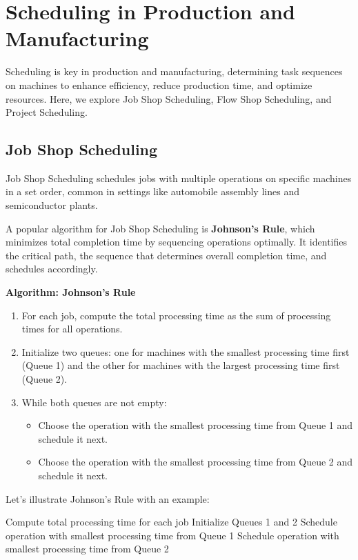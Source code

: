 \documentclass[12pt]{book} %
\begin{document}
\section{Scheduling in Production and Manufacturing}
Scheduling is key in production and manufacturing, determining task sequences on machines to enhance efficiency, reduce production time, and optimize resources. Here, we explore Job Shop Scheduling, Flow Shop Scheduling, and Project Scheduling.

\subsection{Job Shop Scheduling}
Job Shop Scheduling schedules jobs with multiple operations on specific machines in a set order, common in settings like automobile assembly lines and semiconductor plants.

A popular algorithm for Job Shop Scheduling is \textbf{Johnson's Rule}, which minimizes total completion time by sequencing operations optimally. It identifies the critical path, the sequence that determines overall completion time, and schedules accordingly.


\textbf{Algorithm: Johnson's Rule}
\begin{enumerate}
    \item For each job, compute the total processing time as the sum of processing times for all operations.
    \item Initialize two queues: one for machines with the smallest processing time first (Queue 1) and the other for machines with the largest processing time first (Queue 2).
    \item While both queues are not empty:
    \begin{itemize}
        \item Choose the operation with the smallest processing time from Queue 1 and schedule it next.
        \item Choose the operation with the smallest processing time from Queue 2 and schedule it next.
    \end{itemize}
\end{enumerate}

Let's illustrate Johnson's Rule with an example:
\FloatBarrier
\FloatBarrier
\begin{algorithm}
\caption{Johnson's Rule}
\begin{algorithmic}[1]
\State Compute total processing time for each job
\State Initialize Queues 1 and 2
    \State Schedule operation with smallest processing time from Queue 1
    \State Schedule operation with smallest processing time from Queue 2
\EndWhile
\EndProcedure
\end{algorithmic}
\end{algorithm}
\FloatBarrier
\end{document}
